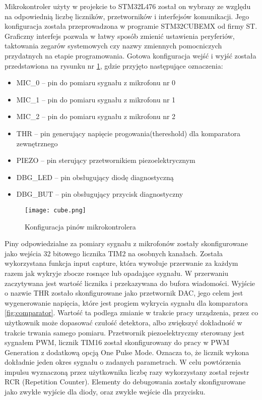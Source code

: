 Mikrokontroler użyty w projekcie to STM32L476 został on wybrany ze względu na odpowiednią liczbę liczników, przetworników i interfejsów komunikacji. 
Jego konfiguracja została przeprowadzona w programie STM32CUBEMX od firmy ST. 
Graficzny interfejs pozwala w łatwy sposób zmienić ustawienia peryferiów, 
taktowania zegarów systemowych czy nazwy zmiennych pomocniczych przydatnych na etapie programowania.
Gotowa konfiguracja wejść i wyjść została przedstawiona na rysunku nr \ref{fig:cube}, gdzie przyjęto następujące oznaczenia:

\begin{itemize}
    \item MIC\_0 -- pin do pomiaru sygnału z mikrofonu nr 0
    \item MIC\_1 -- pin do pomiaru sygnału z mikrofonu nr 1
    \item MIC\_2 -- pin do pomiaru sygnału z mikrofonu nr 2
    \item THR -- pin generujący napięcie progowania(thereshold) dla komparatora zewnętrznego 
    \item PIEZO -- pin sterujący przetwornikiem piezoelektrycznym 
    \item DBG\_LED -- pin obsługujący diodę diagnostyczną
    \item DBG\_BUT -- pin obsługujący przycisk diagnostyczny
\end{itemize}

\begin{figure}[ht!]
    \centering
    \texttt{[image: cube.png]}
    \caption{Konfiguracja pinów mikrokontrolera}
    \label{fig:cube}
\end{figure}

Piny odpowiedzialne za pomiary sygnału z mikrofonów zostały skonfigurowane jako wejścia 32 bitowego licznika TIM2 na osobnych kanałach. 
Została wykorzystana funkcja input capture, która wywołuje przerwanie za każdym razem jak wykryje zbocze rosnące lub opadające sygnału. 
W przerwaniu zaczytywana jest wartość licznika i przekazywana do bufora wiadomości.
Wyjście o nazwie THR zostało skonfigurowane jako przetwornik DAC, jego celem jest wygenerowanie napięcia, 
które jest progiem wykrycia sygnału dla komparatora \ref{fig:comparator}. Wartość ta podlega zmianie w trakcie pracy urządzenia, 
przez co użytkownik może dopasować czułość detektora, albo zwiększyć dokładność w trakcie trwania samego pomiaru.
Przetwornik piezoelektryczny sterowany jest sygnałem PWM, licznik TIM16 został skonfigurowany do pracy w PWM Generation z dodatkową opcją One Pulse Mode. 
Oznacza to, że licznik wykona dokładnie jeden okres sygnału o zadanych parametrach. 
W celu powtórzenia impulsu wyznaczoną przez użytkownika liczbę razy wykorzystany został rejestr RCR (Repetition Counter).
Elementy do debugowania zostały skonfigurowane jako zwykłe wyjście dla diody, oraz zwykłe wejście dla przycisku.

